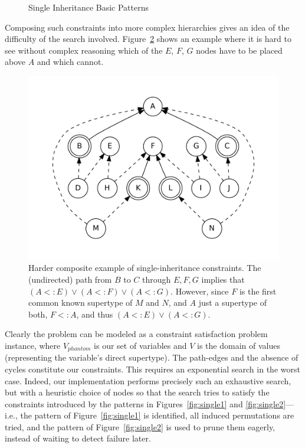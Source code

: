 \begin{figure}[t]
\begin{minipage}[t]{0.5\linewidth}
    \label{fig:single4}
  \end{minipage}
  \caption{Single Inheritance Basic Patterns}
\end{figure}

Composing such constraints into more complex hierarchies gives an idea
of the difficulty of the search involved. Figure~\ref{fig:hard:or}
shows an example where it is hard to see without complex
reasoning which of the $E$, $F$, $G$ nodes have to be placed
above $A$ and which cannot.

\begin{figure}
  \centering
  \includegraphics[scale=0.7]{figures/complementation/single-or.pdf}
  \caption[Harder composite example of single-inheritance
  constraints]{ Harder composite example of single-inheritance
    constraints.  The (undirected) path from $B$ to $C$ through
    $E,F,G$ implies that $(A <: E) \lor (A <: F) \lor (A <:
    G)$. However, since $F$ is the first common known supertype of $M$
    and $N$, and $A$ just a supertype of both, $F <: A$, and thus
    $(A <: E) \lor (A <: G)$. }
\label{fig:hard:or}
\end{figure}


Clearly the problem can be modeled as a constraint satisfaction
problem instance, where $V_{phantom}$ is our set of variables and $V$
is the domain of values (representing the variable's direct
supertype). The path-edges and the absence of cycles constitute our
constraints. This requires an exponential search in the worst
case. Indeed, our implementation performs precisely such an exhaustive
search, but with a heuristic choice of nodes so that the search tries
to satisfy the constraints introduced by the patterns in
Figures~\ref{fig:single1} and \ref{fig:single2}---i.e., the pattern of
Figure~\ref{fig:single1} is identified, all induced permutations are
tried, and the pattern of Figure~\ref{fig:single2} is used to prune
them eagerly, instead of waiting to detect failure later.

